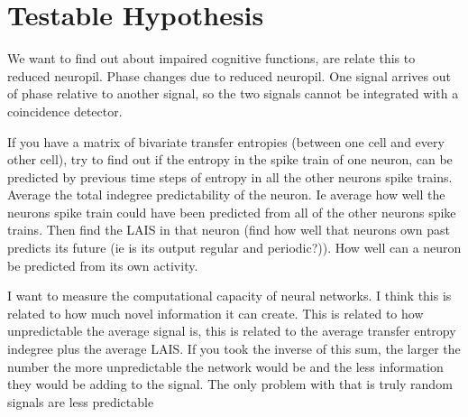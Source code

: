 \documentclass[a4paper,11pt]{article}
\begin{document}

%
\section{Testable Hypothesis}





We want to find out about impaired cognitive functions, are relate this to reduced neuropil. Phase changes due to reduced neuropil. One signal arrives out of phase relative to another signal, so the two signals cannot be integrated with a coincidence detector.

If you have a matrix of bivariate transfer entropies (between one cell and every other cell), try to find out if the entropy in the spike train of one neuron, can be predicted by previous time steps of entropy in all the other neurons spike trains. Average the total indegree predictability of the neuron. Ie average how well the neurons spike train could have been predicted from all of the other neurons spike trains. Then find the LAIS in that neuron (find how well that neurons own past predicts its future (ie is its output regular and periodic?)). How well can a neuron be predicted from its own activity. 

I want to measure the computational capacity of neural networks. I think this is related to how much novel information it can create. This is related to how unpredictable the average signal is, this is related to the average transfer entropy indegree plus the average LAIS. If you took the inverse of this sum, the larger the number the more unpredictable the network would be and the less information they would be adding to the signal. The only problem with that is truly random signals are less predictable
\end{document}

